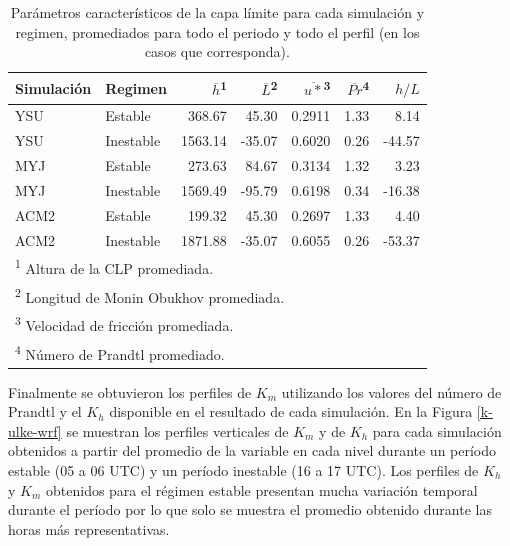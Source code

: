 \documentclass[12pt,spanish,oneside, a4paper]{book}
\begin{document}
\begin{table}[!h]

\caption{\label{tab:tabla-clp}Parámetros característicos de la capa límite para cada simulación y regimen, promediados para todo el periodo y todo el perfil (en los casos que corresponda). \label{tabla-clp}}
\centering
\begin{tabular}[t]{llrrrrr}
\toprule
Simulación & Regimen & $\overline{h}$\textsuperscript{1} & $\overline{L}$\textsuperscript{2} & $\overline{u*}$\textsuperscript{3} & $\overline{Pr}$\textsuperscript{4} & $h/L$\\
\midrule
YSU & Estable & 368.67 & 45.30 & 0.2911 & 1.33 & 8.14\\
YSU & Inestable & 1563.14 & -35.07 & 0.6020 & 0.26 & -44.57\\
MYJ & Estable & 273.63 & 84.67 & 0.3134 & 1.32 & 3.23\\
MYJ & Inestable & 1569.49 & -95.79 & 0.6198 & 0.34 & -16.38\\
ACM2 & Estable & 199.32 & 45.30 & 0.2697 & 1.33 & 4.40\\
ACM2 & Inestable & 1871.88 & -35.07 & 0.6055 & 0.26 & -53.37\\
\bottomrule
\multicolumn{7}{l}{\textsuperscript{1} Altura de la CLP promediada.}\\
\multicolumn{7}{l}{\textsuperscript{2} Longitud de Monin Obukhov promediada.}\\
\multicolumn{7}{l}{\textsuperscript{3} Velocidad de fricción promediada.}\\
\multicolumn{7}{l}{\textsuperscript{4} Número de Prandtl promediado.}\\
\end{tabular}
\end{table}

Finalmente se obtuvieron los perfiles de \(K_m\) utilizando los valores
del número de Prandtl y el \(K_h\) disponible en el resultado de cada
simulación. En la Figura \ref{k-ulke-wrf} se muestran los perfiles
verticales de \(K_m\) y de \(K_h\) para cada simulación obtenidos a
partir del promedio de la variable en cada nivel durante un período
estable (05 a 06 UTC) y un período inestable (16 a 17 UTC). Los perfiles
de \(K_h\) y \(K_m\) obtenidos para el régimen estable presentan mucha
variación temporal durante el período por lo que solo se muestra el
promedio obtenido durante las horas más representativas.
\end{document}
